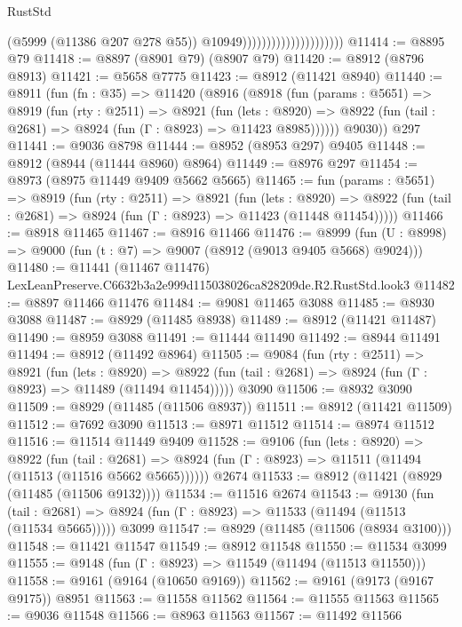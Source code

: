 \begin{lexlean}{RustStd}
\begin{coremodule}
                                              (@5999 (@11386 @207 @278 @55))
                                              @10949)))))))))))))))))))))
@11414 := @8895 @79
@11418 := @8897 (@8901 @79) (@8907 @79)
@11420 := @8912 (@8796 @8913)
@11421 := @5658 @7775
@11423 := @8912 (@11421 @8940)
@11440 := @8911
    (fun (fn : @35) =>
    @11420
      (@8916
        (@8918
          (fun (params : @5651) =>
          @8919
            (fun (rty : @2511) =>
            @8921
              (fun (lets : @8920) =>
              @8922 (fun (tail : @2681) => @8924 (fun (Γ : @8923) => @11423 @8985))))))
        @9030))
    @297
@11441 := @9036 @8798
@11444 := @8952 (@8953 @297) @9405
@11448 := @8912 (@8944 (@11444 @8960) @8964)
@11449 := @8976 @297
@11454 := @8973 (@8975 @11449 @9409 @5662 @5665)
@11465 := fun (params : @5651) =>
  @8919
    (fun (rty : @2511) =>
    @8921
      (fun (lets : @8920) =>
      @8922 (fun (tail : @2681) => @8924 (fun (Γ : @8923) => @11423 (@11448 @11454)))))
@11466 := @8918 @11465
@11467 := @8916 @11466
@11476 := @8999 (fun (U : @8998) => @9000 (fun (t : @7) => @9007 (@8912 (@9013 @9405 @5668) @9024)))
@11480 := @11441 (@11467 @11476) LexLeanPreserve.C6632b3a2e999d115038026ca828209de.R2.RustStd.look3
@11482 := @8897 @11466 @11476
@11484 := @9081 @11465 @3088
@11485 := @8930 @3088
@11487 := @8929 (@11485 @8938)
@11489 := @8912 (@11421 @11487)
@11490 := @8959 @3088
@11491 := @11444 @11490
@11492 := @8944 @11491
@11494 := @8912 (@11492 @8964)
@11505 := @9084
    (fun (rty : @2511) =>
    @8921
      (fun (lets : @8920) =>
      @8922 (fun (tail : @2681) => @8924 (fun (Γ : @8923) => @11489 (@11494 @11454)))))
    @3090
@11506 := @8932 @3090
@11509 := @8929 (@11485 (@11506 @8937))
@11511 := @8912 (@11421 @11509)
@11512 := @7692 @3090
@11513 := @8971 @11512
@11514 := @8974 @11512
@11516 := @11514 @11449 @9409
@11528 := @9106
    (fun (lets : @8920) =>
    @8922
      (fun (tail : @2681) =>
      @8924 (fun (Γ : @8923) => @11511 (@11494 (@11513 (@11516 @5662 @5665))))))
    @2674
@11533 := @8912 (@11421 (@8929 (@11485 (@11506 @9132))))
@11534 := @11516 @2674
@11543 := @9130
    (fun (tail : @2681) => @8924 (fun (Γ : @8923) => @11533 (@11494 (@11513 (@11534 @5665)))))
    @3099
@11547 := @8929 (@11485 (@11506 (@8934 @3100)))
@11548 := @11421 @11547
@11549 := @8912 @11548
@11550 := @11534 @3099
@11555 := @9148 (fun (Γ : @8923) => @11549 (@11494 (@11513 @11550)))
@11558 := @9161 (@9164 (@10650 @9169))
@11562 := @9161 (@9173 (@9167 @9175)) @8951
@11563 := @11558 @11562
@11564 := @11555 @11563
@11565 := @9036 @11548
@11566 := @8963 @11563
@11567 := @11492 @11566

\end{coremodule}
\end{lexlean}
